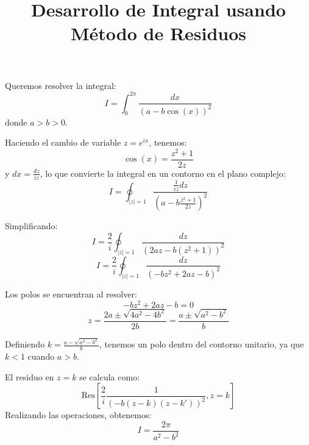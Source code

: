 \documentclass[12pt]{article}
\title{Desarrollo de Integral usando Método de Residuos}
\author{}
\date{}
\begin{document}
\maketitle

Queremos resolver la integral:
\begin{equation*}
I = \int_{0}^{2\pi} \frac{dx}{(a - b\cos(x))^2}
\end{equation*}
donde \( a > b > 0 \).

Haciendo el cambio de variable \( z = e^{ix} \), tenemos:
\begin{equation*}
\cos(x) = \frac{z^2 + 1}{2z}
\end{equation*}
y \( dx = \frac{dz}{iz} \), lo que convierte la integral en un contorno en el plano complejo:
\begin{equation*}
I = \oint_{|z|=1} \frac{\frac{1}{iz} dz}{\left(a - b \frac{z^2 + 1}{2z}\right)^2}
\end{equation*}

Simplificando:
\begin{equation*}
I = \frac{2}{i} \oint_{|z|=1} \frac{dz}{\left( 2az - b(z^2 + 1) \right)^2}
\end{equation*}
\begin{equation*}
I = \frac{2}{i} \oint_{|z|=1} \frac{dz}{\left( -bz^2 + 2az - b \right)^2}
\end{equation*}

Los polos se encuentran al resolver:
\begin{equation*}
-bz^2 + 2az - b = 0
\end{equation*}
\begin{equation*}
z = \frac{2a \pm \sqrt{4a^2 - 4b^2}}{2b} = \frac{a \pm \sqrt{a^2 - b^2}}{b}
\end{equation*}

Definiendo \( k = \frac{a - \sqrt{a^2 - b^2}}{b} \), tenemos un polo dentro del contorno unitario, ya que \( k < 1 \) cuando \( a > b \).

El residuo en \( z = k \) se calcula como:
\begin{equation*}
\text{Res} \left[ \frac{2}{i} \frac{1}{\left( -b(z-k)(z-k') \right)^2}, z = k \right]
\end{equation*}
Realizando las operaciones, obtenemos:
\begin{equation*}
I = \frac{2\pi}{a^2 - b^2}
\end{equation*}
\end{document}
